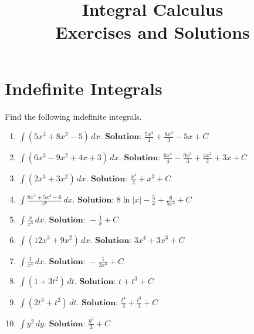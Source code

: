 \documentclass{article}
\title{Integral Calculus \\ Exercises and Solutions}
\author{}
\date{}
\begin{document}
\maketitle
\vspace{-1.5cm}

\section*{Indefinite Integrals}

Find the following indefinite integrals.

\begin{enumerate}[leftmargin=0.5cm, label=(\alph*), rightmargin=0.2cm]
    \item $\int (5x^3 + 8x^2 - 5) \, dx$.\quad
    \(
    \textbf{Solution: } \frac{5x^4}{4} + \frac{8x^3}{3} - 5x + C
    \)

    \item $\int (6x^3 - 9x^2 + 4x + 3) \, dx$.\quad
    \(
    \textbf{Solution: } \frac{6x^4}{4} - \frac{9x^3}{3} + \frac{4x^2}{2} + 3x + C
    \)

    \item $\int (2x^3 + 3x^2) \, dx$.\quad
    \(
    \textbf{Solution: } \frac{x^4}{2} + x^3 + C
    \)

    \item $\int \frac{8x^5 + 5x^4 - 6}{x^6} \, dx$.\quad
    \(
    \textbf{Solution: } 8\ln|x| - \frac{5}{x} + \frac{6}{5x^5} + C
    \)

    \item $\int \frac{x}{x^3} \, dx$.\quad
    \(
    \textbf{Solution: } -\frac{1}{x} + C
    \)

    \item $\int (12x^3 + 9x^2) \, dx$.\quad
    \(
    \textbf{Solution: } 3x^4 + 3x^3 + C
    \)

    \item $\int \frac{1}{x^4} \, dx$.\quad
    \(
    \textbf{Solution: } -\frac{1}{3x^3} + C
    \)

    \item $\int (1 + 3t^2) \, dt$.\quad
    \(
    \textbf{Solution: } t + t^3 + C
    \)

    \item $\int (2t^3 + t^2) \, dt$.\quad
    \(
    \textbf{Solution: } \frac{t^4}{2} + \frac{t^3}{3} + C
    \)

    \item $\int y^2 \, dy$.\quad
    \(
    \textbf{Solution: } \frac{y^3}{3} + C
    \)


\end{enumerate}
\end{document}
